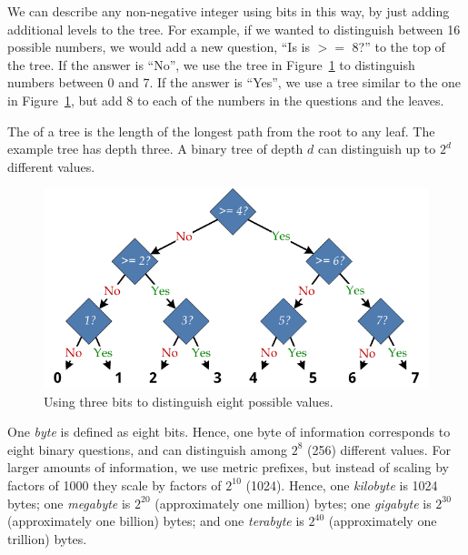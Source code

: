 We can describe any non-negative integer using bits in this way, by just adding additional levels to the tree.  For example, if we wanted to distinguish between 16 possible numbers, we would add a new question, ``Is is $>=$ 8?'' to the top of the tree.  If the answer is ``No'', we use the tree in Figure~\ref{fig:three-bits} to distinguish numbers between 0 and 7.  If the answer is ``Yes'', we use a tree similar to the one in Figure~\ref{fig:three-bits}, but add 8 to each of the numbers in the questions and the leaves.  

The  of a tree is the length of the longest path from the root to any leaf.  The example tree has depth three.  A binary tree of depth $d$ can distinguish up to $2^d$ different values.

\begin{figure}[th]
\begin{center}
\includegraphics[width=4.5in]{figures/three-bits.pdf}
\end{center}
\caption{Using three bits to distinguish eight possible values.}\label{fig:three-bits}
\end{figure}

  One \emph{byte} is defined as eight bits.  Hence, one byte of information corresponds to eight binary questions, and can distinguish among $2^8$ (256) different values.  For larger amounts of information, we use metric prefixes, but instead of scaling by factors of 1000 they scale by factors of $2^{10}$ (1024).  Hence, one \emph{kilobyte} is 1024 bytes; one \emph{megabyte} is $2^{20}$ (approximately one million) bytes; one \emph{gigabyte} is $2^{30}$ (approximately one billion) bytes; and one \emph{terabyte} is $2^{40}$  (approximately one trillion) bytes.

